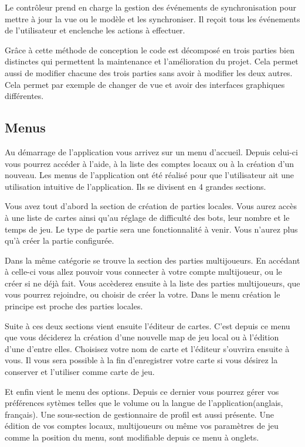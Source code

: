 	Le contrôleur prend en charge la gestion des événements de synchronisation pour mettre à jour la vue ou le modèle et les synchroniser. Il reçoit tous les événements de l'utilisateur et enclenche les actions à effectuer.
			
	Grâce à cette méthode de conception le code est décomposé en trois parties bien distinctes qui permettent la maintenance et l'amélioration du projet. Cela permet aussi de modifier chacune des trois parties sans avoir à modifier les deux autres. Cela permet par exemple de changer de vue et avoir des interfaces graphiques différentes.
			
\subsection{Menus}

	Au démarrage de l'application vous arrivez sur un menu d'accueil. Depuis
	celui-ci vous pourrez accéder à l'aide, à la liste des comptes locaux ou à la
	création d'un nouveau.
	Les menus de l'application ont été réalisé pour que l'utilisateur ait
	une utilisation intuitive de l'application. Ils se divisent en 4 grandes sections.
		
	Vous avez tout d'abord la section de création de parties locales. Vous aurez
	accès à une liste de cartes ainsi qu'au réglage de difficulté des bots, leur
	nombre et le temps de jeu. Le type de partie sera une fonctionnalité à venir.
	Vous n'aurez plus qu'à créer la partie configurée.
		
	Dans la même catégorie se trouve la section des parties multijoueurs. En
	accédant à celle-ci vous allez pouvoir vous connecter à votre compte
	multijoueur, ou le créer si ne déjà fait. Vous accèderez ensuite à la liste
	des parties multijoueurs, que vous pourrez rejoindre, ou choisir de créer la
	votre. Dans le menu création le principe est proche des parties locales.
		
	Suite à ces deux sections vient ensuite l'éditeur de cartes. C'est depuis ce
	menu que vous déciderez la création d'une nouvelle map de jeu local ou à
	l'édition d'une d'entre elles. Choisisez votre nom de carte et l'éditeur
	s'ouvrira ensuite à vous. Il vous sera possible à la fin d'enregistrer votre
	carte si vous désirez la conserver et l'utiliser comme carte de jeu.
		
	Et enfin vient le menu des options. Depuis ce dernier vous pourrez gérer vos
	préférences sytèmes telles que le volume ou la langue de
	l'application(anglais, français).
	Une sous-section de gestionnaire de profil
	est aussi présente. Une édition de vos comptes locaux, multijoueurs ou même
	vos paramètres de jeu comme la position du menu, sont modifiable depuis ce
	menu à onglets.
	
